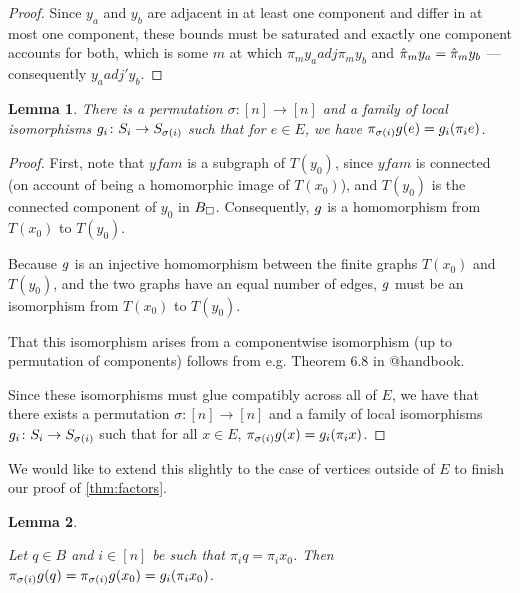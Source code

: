 \documentclass{amsart}
\newtheorem{lemma}{Lemma}
\theoremstyle{definition}
\begin{document}
\begin{proof}
  Since $y_a$ and $y_b$ are adjacent in at least one component and differ in at most one component, these bounds must be saturated and exactly one component accounts for both, which is some $m$ at which $\pi_{m} y_a adj \pi_{m} y_b$ and $\hat{\pi}_{m} y_a = \hat{\pi}_{m} y_b$ --- consequently $y_a adj' y_b$.
\end{proof}


\begin{lemma} 

  There is a permutation $\sigma \colon  [n]\to[n]$ and a family of local isomorphisms $g_i  \colon  S_i \to S_{\sigma(i)}$ such that for $e \in E$, we have $\pi_{\sigma(i)} g(e) = g_i (\pi_i e)$.
\end{lemma}


\begin{proof} 

First, note that $yfam$ is a subgraph of $T(y_0)$, since $yfam$ is connected (on account of being a homomorphic image of $T(x_0)$), and $T(y_0)$ is the connected component of $y_0$ in $B_\square$. Consequently, $g$ is a homomorphism from $T(x_0)$ to $T(y_0)$.

Because $g$ is an injective homomorphism between the finite graphs $T(x_0)$
and $T(y_0)$, and the two graphs have an equal number of edges, $g$ must be an isomorphism from $T(x_0)$ to $T(y_0)$.

That this isomorphism arises from a componentwise isomorphism (up to permutation of components) follows from e.g. Theorem 6.8 in @handbook.

Since these isomorphisms must glue compatibly across all of $E$, we have that there exists a permutation $\sigma  \colon  [n] \to [n]$ and a family of local isomorphisms $g_i  \colon  S_i \to S_{\sigma(i)}$ such that for all $x \in E$, $\pi_{\sigma(i)} g(x) = g_i (\pi_i x)$.
\end{proof}


We would like to extend this slightly to the case of vertices outside of $E$ to finish our proof of  \autoref{thm:factors}.

\begin{lemma} \label{lem:interior}

  Let $q \in B$ and $i \in [n]$ be such that $\pi_i q = \pi_i x_0$. Then $\pi_{\sigma(i)} g(q) = \pi_{\sigma(i)} g(x_0) = g_i (\pi_i x_0)$.
  \end{lemma}
\end{document}
